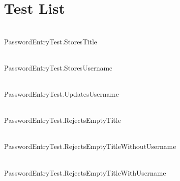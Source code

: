 \chapter{Test List }
\hypertarget{test}{}\label{test}

\begin{DoxyRefList}
\item[{\parbox[t]{\linewidth}{Member \doxylink{_password_entry_test_8cpp_a18c9bf669cfb0f027415d9ea652925c8}{TEST} (Password\+Entry\+Test, Stores\+Title)}}]\hfill \\
\label{test__test000001}%
%
Password\+Entry\+Test.\+Stores\+Title  
\item[{\parbox[t]{\linewidth}{Member \doxylink{_password_entry_test_8cpp_acf73b0a39b664b14daa923816a3686ee}{TEST} (Password\+Entry\+Test, Stores\+Username)}}]\hfill \\
\label{test__test000002}%
%
Password\+Entry\+Test.\+Stores\+Username  
\item[{\parbox[t]{\linewidth}{Member \doxylink{_password_entry_test_8cpp_a410c9fec39e31c36daa249efbd39b721}{TEST} (Password\+Entry\+Test, Updates\+Username)}}]\hfill \\
\label{test__test000003}%
%
Password\+Entry\+Test.\+Updates\+Username  
\item[{\parbox[t]{\linewidth}{Member \doxylink{_password_entry_test_8cpp_a47ade91e155cdc8a81b28709c0f14a9f}{TEST} (Password\+Entry\+Test, Rejects\+Empty\+Title)}}]\hfill \\
\label{test__test000004}%
%
Password\+Entry\+Test.\+Rejects\+Empty\+Title  
\item[{\parbox[t]{\linewidth}{Member \doxylink{_password_entry_test_8cpp_aa6b1e5515ca9966db5d58b1580f9c200}{TEST} (Password\+Entry\+Test, Rejects\+Empty\+Title\+Without\+Username)}}]\hfill \\
\label{test__test000005}%
%
Password\+Entry\+Test.\+Rejects\+Empty\+Title\+Without\+Username  
\item[{\parbox[t]{\linewidth}{Member \doxylink{_password_entry_test_8cpp_a04f4a75ffc016627a40d3f9d3d4be784}{TEST} (Password\+Entry\+Test, Rejects\+Empty\+Title\+With\+Username)}}]\hfill \\
\label{test__test000006}%
%
Password\+Entry\+Test.\+Rejects\+Empty\+Title\+With\+Username  
\item[{\parbox[t]{\linewidth}{Member \doxylink{_password_entry_test_8cpp_ab9db3d08906fe82e4efec352347a8841}{TEST} (Password\+Entry\+Test, Rejects\+Whitespace\+Only\+Title)}}]\hfill \\

\end{DoxyRefList}
